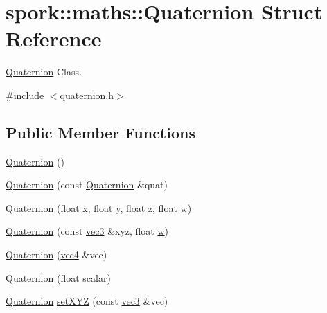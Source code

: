 \hypertarget{structspork_1_1maths_1_1_quaternion}{}\section{spork\+:\+:maths\+:\+:Quaternion Struct Reference}
\label{structspork_1_1maths_1_1_quaternion}


\hyperlink{structspork_1_1maths_1_1_quaternion}{Quaternion} Class.  




{\ttfamily \#include $<$quaternion.\+h$>$}

\subsection*{Public Member Functions}
\begin{DoxyCompactItemize}
\item 
\hyperlink{structspork_1_1maths_1_1_quaternion_a4833d11706aa52389dd084604598ff57}{Quaternion} ()
\item 
\hyperlink{structspork_1_1maths_1_1_quaternion_a00c329e5b67a4a7bf2a9b5c0f5baf419}{Quaternion} (const \hyperlink{structspork_1_1maths_1_1_quaternion}{Quaternion} \&quat)
\item 
\hyperlink{structspork_1_1maths_1_1_quaternion_ac393846f6ea6eab59fcc87289e91622f}{Quaternion} (float \hyperlink{structspork_1_1maths_1_1_quaternion_ac9a551c42de0a7acd0c54bb18d1863e5}{x}, float \hyperlink{structspork_1_1maths_1_1_quaternion_ac6a591cc6515fd357cbc1a4ad49ea667}{y}, float \hyperlink{structspork_1_1maths_1_1_quaternion_a34c6708dbdf1e1e537d034fdab001584}{z}, float \hyperlink{structspork_1_1maths_1_1_quaternion_a5497dc08d45d86aa8faa956df16cb4b1}{w})
\item 
\hyperlink{structspork_1_1maths_1_1_quaternion_abf634fe2081177f26eec00e5aa1bf910}{Quaternion} (const \hyperlink{structspork_1_1maths_1_1vec3}{vec3} \&xyz, float \hyperlink{structspork_1_1maths_1_1_quaternion_a5497dc08d45d86aa8faa956df16cb4b1}{w})
\item 
\hyperlink{structspork_1_1maths_1_1_quaternion_a5ada354b4b8a02ca544cd8860d32a451}{Quaternion} (\hyperlink{structspork_1_1maths_1_1vec4}{vec4} \&vec)
\item 
\hyperlink{structspork_1_1maths_1_1_quaternion_a5801369b22da4196a60178e2992c3563}{Quaternion} (float scalar)
\item 
\hyperlink{structspork_1_1maths_1_1_quaternion}{Quaternion} \hyperlink{structspork_1_1maths_1_1_quaternion_a99c40c3adaa208ca18844873caf57266}{set\+X\+YZ} (const \hyperlink{structspork_1_1maths_1_1vec3}{vec3} \&vec)

\end{DoxyCompactItemize}
